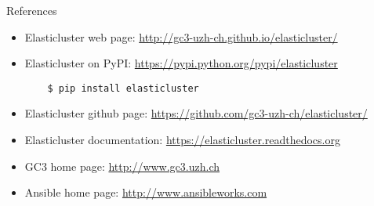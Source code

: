 \documentclass[english,serif,mathserif,usenames,dvipsnames]{beamer}
\begin{document}
\begin{frame}[fragile]
  {References}
  \begin{itemize}
  \item Elasticluster web page: 
    \url{http://gc3-uzh-ch.github.io/elasticluster/}

    \item Elasticluster on PyPI:
      \url{https://pypi.python.org/pypi/elasticluster}
      
\begin{verbatim}
    $ pip install elasticluster
\end{verbatim}

\item Elasticluster github page: 
  \url{https://github.com/gc3-uzh-ch/elasticluster/}
\item Elasticluster documentation:
    \url{https://elasticluster.readthedocs.org}
  \item GC3 home page: \url{http://www.gc3.uzh.ch}
  \item Ansible home page: \url{http://www.ansibleworks.com}
  \end{itemize}
\end{frame}

    
\end{document}
